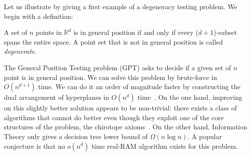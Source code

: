 Let us illustrate by giving a first example of a degeneracy testing problem. We
begin with a definition:

\begin{definition}
A set of \(n\) points in \(\mathbb{R}^d\)
is in general position if and only if every (\(d+1\))-subset spans the entire
space. A point set that is not in general position is called \emph{degenerate}.
\end{definition}

The General Position Testing problem (GPT) asks to decide if a given set of
\(n\) point is in general position. We can solve this problem by brute-force in
\(O(n^{d+1})\) time.
We can do it an order of magnitude faster
by constructing the dual arrangement of hyperplanes in
\(O(n^d)\) time~\cite[Theorem 24.4.1]{Hal04}.
%
On the one hand,
improving on this slightly better solution appears to be non-trivial: there
exists a class of algorithms that cannot do better even though they
exploit one of the core structures of the problem, the chirotope axioms~\cite{BLSWZ93}.
%
On the other hand, Information Theory only gives a decision tree
lower bound of \(\Omega(n \log n)\).
A popular conjecture is that no \(o(n^d)\) time real-RAM
algorithm exists for this problem.
